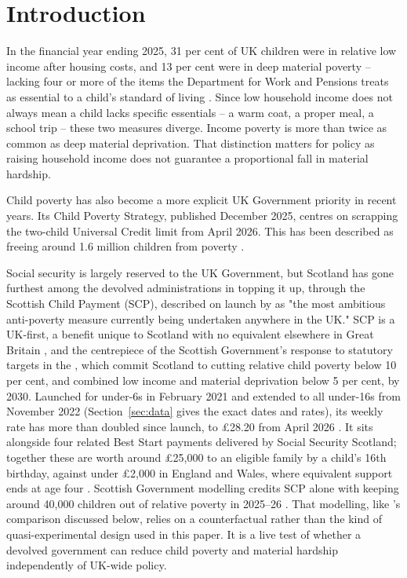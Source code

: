 \section{Introduction}
\label{sec:introduction}

In the financial year ending 2025, 31 per cent of UK children were in relative low income after housing costs, and 13 per cent were in deep material poverty -- lacking four or more of the items the Department for Work and Pensions treats as essential to a child's standard of living \citep{dwp2026,jrf2026}. Since low household income does not always mean a child lacks specific essentials -- a warm coat, a proper meal, a school trip -- these two measures diverge. Income poverty is more than twice as common as deep material deprivation. That distinction matters for policy as raising household income does not guarantee a proportional fall in material hardship.

Child poverty has also become a more explicit UK Government priority in recent years. Its Child Poverty Strategy, published December 2025, centres on scrapping the two-child Universal Credit limit from April 2026. This has been described as freeing around 1.6 million children from poverty \citep{jrf2026}.

Social security is largely reserved to the UK Government, but Scotland has gone furthest among the devolved administrations in topping it up, through the Scottish Child Payment (SCP), described on launch by \citet{scottishgovernment2021} as "the most ambitious anti-poverty measure currently being undertaken anywhere in the UK." SCP is a UK-first, a benefit unique to Scotland with no equivalent elsewhere in Great Britain \citep{scottishgovernment2021,andersen2025}, and the centrepiece of the Scottish Government's response to statutory targets in the \citet{childpovertyact2017}, which commit Scotland to cutting relative child poverty below 10 per cent, and combined low income and material deprivation below 5 per cent, by 2030. Launched for under-6s in February 2021 and extended to all under-16s from November 2022 (Section~\ref{sec:data} gives the exact dates and rates), its weekly rate has more than doubled since launch, to \pounds28.20 from April 2026 \citep{scottishgovernment2026}. It sits alongside four related Best Start payments delivered by Social Security Scotland; together these are worth around \pounds25,000 to an eligible family by a child's 16th birthday, against under \pounds2,000 in England and Wales, where equivalent support ends at age four \citep{scottishgovernment2026}. Scottish Government modelling credits SCP alone with keeping around 40,000 children out of relative poverty in 2025--26 \citep{scottishgovernment2025}. That modelling, like \citet{andersen2025}'s comparison discussed below, relies on a counterfactual rather than the kind of quasi-experimental design used in this paper. It is a live test of whether a devolved government can reduce child poverty and material hardship independently of UK-wide policy.

